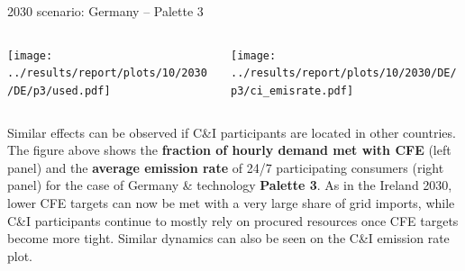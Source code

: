 \begin{frame}{2030 scenario: Germany -- Palette 3}

  {\footnotesize

  \begin{columns}
  \begin{column}{7cm}
  \centering
  \texttt{[image: ../results/report/plots/10/2030/DE/p3/used.pdf]}
  \end{column}

  \begin{column}{8cm}
  \centering
  \texttt{[image: ../results/report/plots/10/2030/DE/p3/ci\_emisrate.pdf]}
  \end{column}

  \end{columns}

  \begin{columns}
  \begin{column}{15cm}
  Similar effects can be observed if C\&I participants are located in other countries. 
  The figure above shows the {\bf fraction of hourly demand met with CFE} (left panel) 
  and the {\bf average emission rate} of 24/7 participating consumers (right panel) 
  for the case of Germany \& technology {\bf Palette 3}.
  As in the Ireland 2030, lower CFE targets can now be met with a very large share of grid imports,
  while C\&I participants continue to mostly rely on procured resources once CFE targets become 
  more tight. Similar dynamics can also be seen on the C\&I emission rate plot. 

  \end{column}
  \end{columns}
  }

\end{frame}


